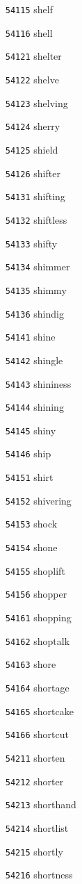 \documentclass[twoside,11pt]{article}
\begin{document}
\begin{multicols}{5}
\begin{enumerate}
\item[\texttt{54115}] shelf
\item[\texttt{54116}] shell
\item[\texttt{54121}] shelter
\item[\texttt{54122}] shelve
\item[\texttt{54123}] shelving
\item[\texttt{54124}] sherry
\item[\texttt{54125}] shield
\item[\texttt{54126}] shifter
\item[\texttt{54131}] shifting
\item[\texttt{54132}] shiftless
\item[\texttt{54133}] shifty
\item[\texttt{54134}] shimmer
\item[\texttt{54135}] shimmy
\item[\texttt{54136}] shindig
\item[\texttt{54141}] shine
\item[\texttt{54142}] shingle
\item[\texttt{54143}] shininess
\item[\texttt{54144}] shining
\item[\texttt{54145}] shiny
\item[\texttt{54146}] ship
\item[\texttt{54151}] shirt
\item[\texttt{54152}] shivering
\item[\texttt{54153}] shock
\item[\texttt{54154}] shone
\item[\texttt{54155}] shoplift
\item[\texttt{54156}] shopper
\item[\texttt{54161}] shopping
\item[\texttt{54162}] shoptalk
\item[\texttt{54163}] shore
\item[\texttt{54164}] shortage
\item[\texttt{54165}] shortcake
\item[\texttt{54166}] shortcut
\item[\texttt{54211}] shorten
\item[\texttt{54212}] shorter
\item[\texttt{54213}] shorthand
\item[\texttt{54214}] shortlist
\item[\texttt{54215}] shortly
\item[\texttt{54216}] shortness

\end{enumerate}
\end{multicols}
\end{document}
